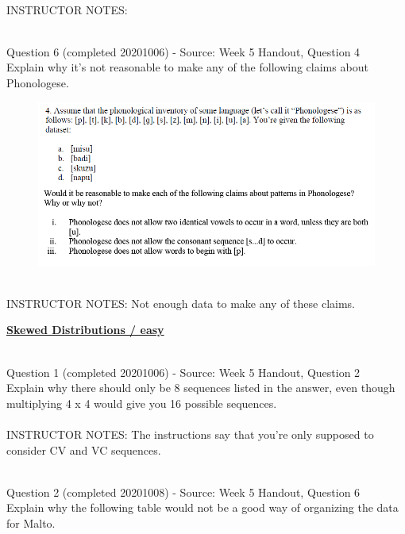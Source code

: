 \documentclass[12pt]{article}
\begin{document}
~\\
INSTRUCTOR NOTES: 


~\\

{\large Question 6} (completed 20201006) - Source: Week 5 Handout, Question 4\\

Explain why it's not reasonable to make any of the following claims about Phonologese.\\

\begin{figure}[H]
\includegraphics{../images/Phonologese.png}
\end{figure}

~\\
INSTRUCTOR NOTES: Not enough data to make any of these claims.


\newpage\textbf{\underline{\huge Skewed Distributions / easy\\}}

~\\

{\large Question 1} (completed 20201006) - Source: Week 5 Handout, Question 2\\

Explain why there should only be 8 sequences listed in the answer, even though multiplying 4 x 4 would give you 16 possible sequences.\\


~\\
INSTRUCTOR NOTES: The instructions say that you're only supposed to consider CV and VC sequences. 


~\\

{\large Question 2} (completed 20201008) - Source: Week 5 Handout, Question 6\\

Explain why the following table would not be a good way of organizing the data for Malto.\\
\end{document}
